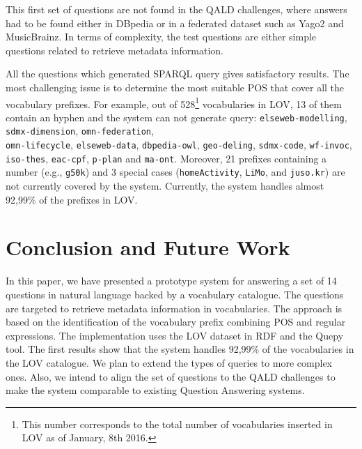 \documentclass{acm}
\newcommand{\todo}[1]{\noindent\textcolor{red}{{\bf \{TODO}: #1{\bf \}}}}
\begin{document}
This first set of questions are not found in the QALD challenges, where answers had to be found either in DBpedia or in a federated dataset such as Yago2 and MusicBrainz. In terms of complexity, the test questions are either simple questions related to retrieve metadata information. 

All the questions which generated SPARQL query gives satisfactory results. The most challenging issue is to determine the most suitable POS that cover all the vocabulary prefixes. For example, out of 528\footnote{This number corresponds to the total number of vocabularies inserted in LOV as of January, 8th 2016.} vocabularies in LOV, 13 of them contain an hyphen and the system can not generate query: \texttt{elseweb-modelling}, \texttt{sdmx-dimension}, \texttt{omn-federation}, \\ \texttt{omn-lifecycle}, \texttt{elseweb-data}, \texttt{dbpedia-owl}, \texttt{geo-deling}, \texttt{sdmx-code}, \texttt{wf-invoc}, \texttt{iso-thes}, \texttt{eac-cpf}, \texttt{p-plan} and \texttt{ma-ont}. Moreover, 21 prefixes containing a number (e.g., \texttt{g50k}) and 3 special cases (\texttt{homeActivity}, \texttt{LiMo}, and \texttt{juso.kr}) are not currently covered by the system. Currently, the system handles almost 92,99\% of the prefixes in LOV.






\section{Conclusion and Future Work}
\label{sec:conclusion}
%

In this paper, we have presented a prototype system for answering a set of 14 questions in natural language backed by a vocabulary catalogue. The questions are targeted to retrieve metadata information in vocabularies. The approach is based on the identification of the vocabulary prefix combining POS and regular expressions. The implementation uses the LOV dataset in RDF and the Quepy tool. The first results show that the system handles 92,99\% of the vocabularies in the LOV catalogue. 
We plan to extend the types of queries to more complex ones. Also, we intend to align the set of questions to the QALD challenges to make the system comparable to existing Question Answering systems.  
\end{document}
